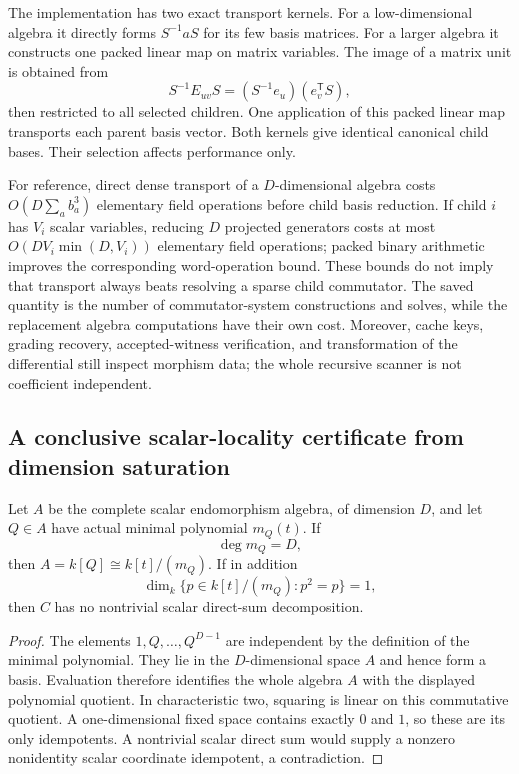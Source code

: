 The implementation has two exact transport kernels. For a low-dimensional
algebra it directly forms $S^{-1}aS$ for its few basis matrices. For a larger
algebra it constructs one packed linear map on matrix variables. The image
of a matrix unit is obtained from
\[
 S^{-1}E_{uv}S=(S^{-1}e_u)(e_v^{\mathsf T}S),
\]
then restricted to all selected children. One application of this packed
linear map transports each parent basis vector. Both kernels give identical
canonical child bases. Their selection affects performance only.

For reference, direct dense transport of a $D$-dimensional algebra costs
$O(D\sum_a b_a^3)$ elementary field operations before child basis
reduction. If child $i$ has $V_i$ scalar variables, reducing $D$ projected
generators costs at most $O(DV_i\min(D,V_i))$ elementary field operations;
packed binary arithmetic improves the corresponding word-operation bound.
These bounds do not imply that transport always beats resolving a sparse
child commutator. The saved quantity is the number of commutator-system
constructions and solves, while the replacement algebra computations have
their own cost. Moreover, cache keys, grading recovery, accepted-witness
verification, and transformation of the differential still inspect
morphism data; the whole recursive scanner is not coefficient independent.

\subsection{A conclusive scalar-locality certificate from dimension saturation}

\begin{theorem}
\label{thm:scalar-locality}
Let $A$ be the complete scalar endomorphism algebra, of dimension $D$, and
let $Q\in A$ have actual minimal polynomial $m_Q(t)$. If
\[
 \deg m_Q=D,
\]
then $A=k[Q]\cong k[t]/(m_Q)$. If in addition
\[
 \dim_k\{p\in k[t]/(m_Q):p^2=p\}=1,
\]
then $C$ has no nontrivial scalar direct-sum decomposition.
\end{theorem}

\begin{proof}
The elements $1,Q,\ldots,Q^{D-1}$ are independent by the definition of the
minimal polynomial. They lie in the $D$-dimensional space $A$ and hence form
a basis. Evaluation therefore identifies the whole algebra $A$ with the
displayed polynomial quotient. In characteristic two, squaring is linear
on this commutative quotient. A one-dimensional fixed space contains exactly
$0$ and $1$, so these are its only idempotents. A nontrivial scalar direct
sum would supply a nonzero nonidentity scalar coordinate idempotent, a
contradiction.\end{proof}

